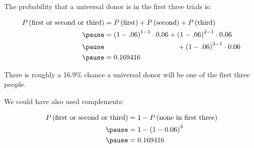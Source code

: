 \documentclass{beamer}
\newcommand{\prob}[1]{P\left({#1}\right)}
\begin{document}
\begin{frame}
  \begin{example}
    The probability that a universal donor is in the first three trials is:\pause

    \vspace{-5mm}
    \begin{equation*}
      \begin{aligned}
        \prob{\text{first or second or third}}
        &= \prob{\text{first}} + \prob{\text{second}} + \prob{\text{third}} \\\pause
        &= {(1-.06)}^{1-1}\cdot0.06 + {(1-.06)}^{2-1}\cdot0.06\\\pause
        &\hspace{3.62cm} + {(1-.06)}^{3-1}\cdot0.06 \\\pause
        &= 0.169416
      \end{aligned}
    \end{equation*}

    \vspace{-2mm}
    There is roughly a 16.9\% chance a universal donor will be one of the first three people.
  \end{example}\pause

  \begin{note}
    We could have also used complements:

    \vspace{-2mm}
    \begin{equation*}
      \begin{aligned}
        \prob{\text{first or second or third}}
        &= 1 - \prob{\text{none in first three}} \\\pause
        &= 1 - {(1-0.06)}^3 \\\pause
        &= 0.169416
      \end{aligned}
    \end{equation*}
  \end{note}
\end{frame}
\end{document}
